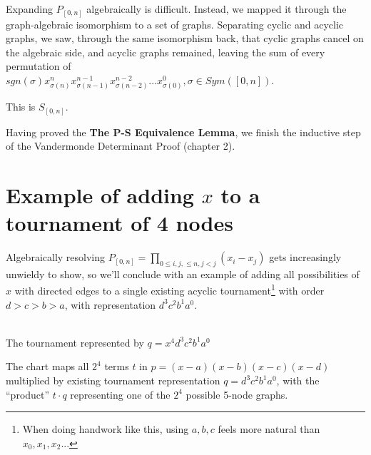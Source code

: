 \documentclass[11pt, oneside]{article} 	%
\begin{document}
Expanding $P_{[0,n]}$ algebraically is difficult.  Instead, we mapped it through the graph-algebraic isomorphism to a set of graphs.  Separating cyclic and acyclic graphs, we saw, through the same isomorphism back, that cyclic graphs cancel on the algebraic side, and acyclic graphs remained, leaving the sum of every permutation of  
\\
$sgn(\sigma) x_{\sigma(n)}^{n} x_{\sigma(n-1)}^{n-1} x_{\sigma(n-2)}^{n-2} ... x_{\sigma(0)}^{0}, \sigma \in Sym([0,n])$.

This is $S_{[0,n]}$.

Having proved the \textbf{The P-S Equivalence Lemma}, we finish the inductive step of the Vandermonde Determinant Proof (chapter 2).

\section{Example of adding $x$ to a tournament of 4 nodes} 

Algebraically resolving $P_{[0,n]} = \prod_{0 \leq i, j, \leq n, j < j} (x_i - x_j)$ gets increasingly unwieldy to show, so we'll conclude with an example of adding all possibilities of $x$ with directed edges to a single existing acyclic tournament\footnote{When doing handwork like this, using $a,b,c$ feels more natural than $x_0, x_1, x_2...$}  with order $d > c > b > a$, with representation $d^3c^2b^1a^0$.
\\

\\

The tournament represented by $q=x^4d^3c^2b^1a^0$

The chart maps all $2^4$ terms $t$ in $p=(x-a)(x-b)(x-c)(x-d)$ multiplied by existing tournament representation $q=d^3c^2b^1a^0$, with the ``product'' $t \cdot q$ representing one of the $2^4$ possible 5-node graphs.
\end{document}
